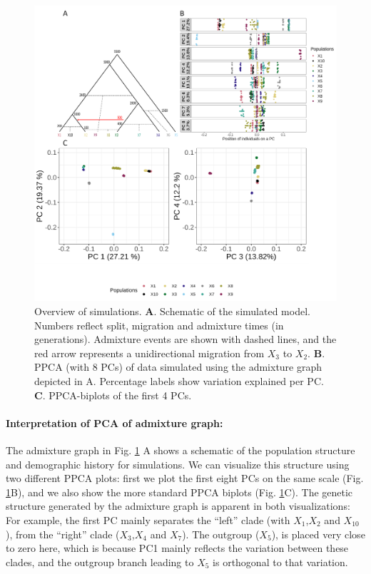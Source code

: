 \documentclass[12pt]{article}
\begin{document}
\begin{figure}[ht!]
    \includegraphics[width=16.5cm]{Images/Figures/sim_final.png}
    \centering
    \caption{Overview of simulations. \textbf{A}. Schematic of the simulated model. Numbers reflect split, migration and admixture times (in generations). Admixture events are shown with dashed lines, and the red arrow represents a unidirectional migration from $X_3$ to $X_2$. \textbf{B}. PPCA (with 8 PCs) of data simulated using the admixture graph depicted in A. Percentage labels show variation explained per PC. \textbf{C}. PPCA-biplots of the first 4 PCs.
}
    \label{fig2:sim}
\end{figure}

\paragraph{Interpretation of PCA of admixture graph:}
The admixture graph in Fig. \ref{fig2:sim} A shows a schematic of the population structure and demographic history for simulations. We can visualize this structure using two different PPCA plots: first we plot the first eight PCs on the same scale (Fig. \ref{fig2:sim}B), and we also show the more standard PPCA biplots (Fig. \ref{fig2:sim}C). The genetic structure generated by the admixture graph is apparent in both visualizations: For example, the first PC mainly separates  the ``left'' clade (with $X_1$,$X_2$ and $X_{10}$), from the ``right'' clade ($X_3$,$X_4$ and $X_7$). The outgroup ($X_5$), is placed very close to zero here, which is because PC1 mainly reflects the variation between these clades, and the outgroup branch leading to $X_5$ is orthogonal to that variation. 
\end{document}
